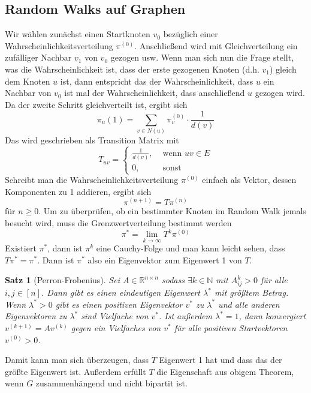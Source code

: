\documentclass[a4paper, 12pt]{article}
\theoremstyle{plain}
\newtheorem{theorem}{Satz}[subsection] %
\theoremstyle{definition}
\theoremstyle{lemma}
\theoremstyle{remark}
\theoremstyle{corollary}
\theoremstyle{example}
\begin{document}
	\subsection{Random Walks auf Graphen}
	Wir wählen zunächst einen Startknoten $v_0$ bezüglich einer Wahrscheinlichkeitsverteilung $\pi^{(0)}$. Anschließend wird mit Gleichverteilung ein zufälliger Nachbar $v_1$ von $v_0$ gezogen usw. Wenn man sich nun die Frage stellt, was die Wahrscheinlichkeit ist, dass der erste gezogenen Knoten (d.h. $v_1$) gleich dem Knoten $u$ ist, dann entspricht das der Wahrscheinlichkeit, dass $u$ ein Nachbar von $v_0$ ist mal der Wahrscheinlichkeit, dass anschließend $u$ gezogen wird. Da der zweite Schritt gleichverteilt ist, ergibt sich \[\pi_u(1) = \sum_{v \in N(u)} \pi_v^{(0)} \cdot \frac{1}{d(v)}\] Das wird geschrieben als Transition Matrix mit \[T_{uv} = \begin{cases}
		\frac{1}{d(v)}, & \text{ wenn } uv \in E\\
		0, & \text{ sonst}
	\end{cases}\]
	Schreibt man die Wahrscheinlichkeitsverteilung $\pi^{(0)}$ einfach als Vektor, dessen Komponenten zu 1 addieren, ergibt sich \[\pi^{(n+1)} = T\pi^{(n)}\] für $n\geq 0$. Um zu überprüfen, ob ein bestimmter Knoten im Random Walk jemals besucht wird, muss die Grenzwertverteilung bestimmt werden \[\pi^* = \lim_{k \to \infty} T^k\pi^{(0)}\]
	Existiert $\pi^*$, dann ist $\pi^{k}$ eine Cauchy-Folge und man kann leicht sehen, dass $T\pi^* = \pi^*$. Dann ist $\pi^*$ also ein Eigenvektor zum Eigenwert 1 von $T$.
	\begin{theorem}[Perron-Frobenius]
		\label{thm: PF}
		Sei $A \in \mathbb{R}^{n \times n}$ sodass $\exists k \in \mathbb{N}$ mit $A_{ij}^k > 0$ für alle $i,j \in [n]$. Dann gibt es einen eindeutigen Eigenwert $\lambda^*$ mit größtem Betrag. Wenn $\lambda^* >0$ gibt es einen positiven Eigenvektor $v^*$ zu $\lambda^*$ und alle anderen Eigenvektoren zu $\lambda^*$ sind Vielfache von $v^*$. Ist außerdem $\lambda^* = 1$, dann konvergiert $v^{(k+1)} = Av^{(k)}$ gegen ein Vielfaches von $v^*$ für alle positiven Startvektoren $v^{(0)} > 0$.
	\end{theorem}
	Damit kann man sich überzeugen, dass $T$ Eigenwert 1 hat und dass das der größte Eigenwert ist. Außerdem erfüllt $T$ die Eigenschaft aus obigem Theorem, wenn $G$ zusammenhängend und nicht bipartit ist.
\end{document}
